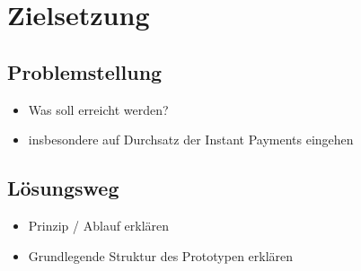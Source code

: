 \chapter{Zielsetzung}

\section{Problemstellung}
\begin{itemize}
  \item Was soll erreicht werden?
  \item insbesondere auf Durchsatz der Instant Payments eingehen
\end{itemize}

\section{L\"osungsweg}
\begin{itemize}
  \item Prinzip / Ablauf erklären
  \item Grundlegende Struktur des Prototypen erklären
\end{itemize}


\cite{Knuth:1998:ACP:280635}